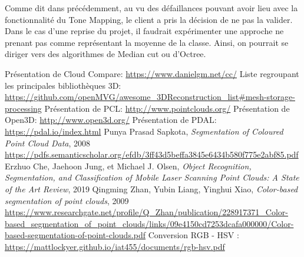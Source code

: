 \documentclass[12pt,titlepage,french]{article}
\begin{document}
Comme dit dans précédemment, au vu des défaillances pouvant avoir lieu avec la fonctionnalité du Tone Mapping, le client a pris la décision de ne pas la valider. Dans le cas d'une reprise du projet, il faudrait expérimenter une approche ne prenant pas comme représentant la moyenne de la classe. Ainsi, on pourrait se diriger vers des algorithmes de Median cut ou d'Octree.

\newpage
\begin{thebibliography}{3}
	 Présentation de Cloud Compare: \url{https://www.danielgm.net/cc/}
	 Liste regroupant les principales bibliothèques 3D: \url{https://github.com/openMVG/awesome_3DReconstruction_list#mesh-storage-processing}
	 Présentation de PCL: \url{http://www.pointclouds.org/}
	 Présentation de Open3D: \url{http://www.open3d.org/}
	 Présentation de PDAL: \url{https://pdal.io/index.html}
	 Punya Prasad Sapkota, \textit{Segmentation of Coloured Point Cloud Data}, 2008 \url{https://pdfs.semanticscholar.org/efdb/3ff43d5beffa3845e6434b580f775e2abf85.pdf}
	 Erzhuo Che, Jaehoon Jung, et Michael J. Olsen, \textit{Object Recognition, Segmentation, and Classification of Mobile Laser Scanning Point Clouds: A State of the Art Review}, 2019
	 Qingming Zhan, Yubin Liang, Yinghui Xiao, \textit{Color-based segmentation of point clouds}, 2009 \url{https://www.researchgate.net/profile/Q_Zhan/publication/228917371_Color-based_segmentation_of_point_clouds/links/09e4150cd7253dcafa000000/Color-based-segmentation-of-point-clouds.pdf}
  	 Conversion RGB - HSV : \url{https://mattlockyer.github.io/iat455/documents/rgb-hsv.pdf}
\end{thebibliography}
\end{document}
